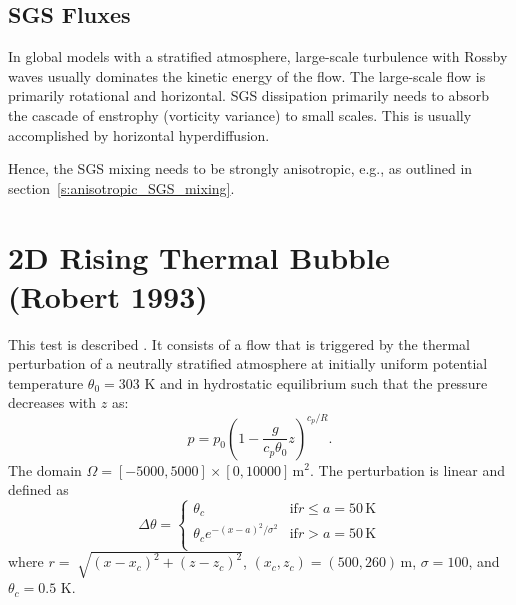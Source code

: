 \documentclass{report}
\begin{document}
{\subsection{SGS Fluxes}

In global models with a stratified atmosphere, large-scale turbulence with Rossby waves usually dominates the kinetic energy of the flow. The large-scale flow is primarily rotational and horizontal. SGS dissipation primarily needs to absorb the cascade of enstrophy (vorticity variance) to small scales. This is usually accomplished by horizontal hyperdiffusion.

Hence, the SGS mixing needs to be strongly anisotropic, e.g., as outlined in section~\ref{s:anisotropic_SGS_mixing}.

\section{2D Rising Thermal Bubble (Robert 1993)}
\label{2dRTBtest}
This test is described \cite{robert1993}. It consists of a flow that is triggered by the thermal perturbation of a neutrally stratified atmosphere at initially uniform potential temperature $\theta_0 = 303$ K
and in hydrostatic equilibrium such that the pressure decreases with $z$ as:
\begin{equation}
\label{pressureDistrib}
p = p_{0}\left(1-\frac{g}{c_p{\theta_{0}}}z\right)^{c_p/R}.
\end{equation}
The domain $\Omega=[-5000,5000]\times[0,10000]\,\mathrm{m}^2$.
The perturbation is linear and defined as
\begin{equation}
 \Delta\theta = \left\{ \begin{array}{ll}
 \theta_c & \mathrm{if } r \leq a=50\,{\mathrm K}\\
 \theta_c e^{-(x - a)^2/\sigma^2} & \mathrm{if } r > a=50\,{\mathrm K}\\
\end{array} \right.
\label{eq:robertIni}
\end{equation}
where $r = \sqrt[]{(x-x_{c})^{2} + (z-z_{c})^{2}}$, $(x_c,z_c) = (500,260)\,\mathrm{m}$, $\sigma = 100$, and $\theta_c=0.5$ K.

}
\end{document}
